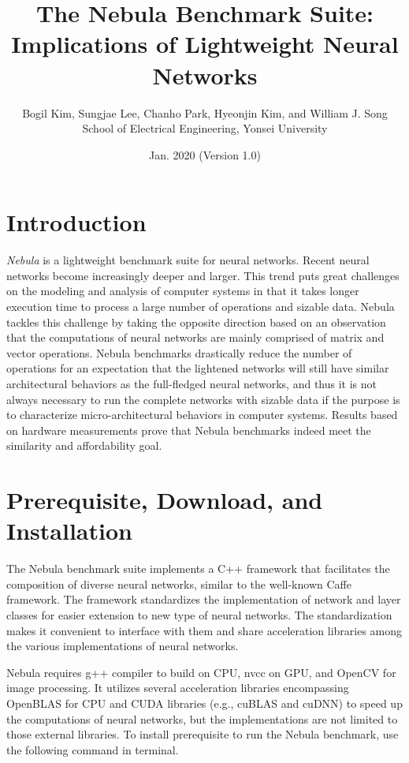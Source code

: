 \documentclass[10pt]{article}
\begin{document}
\title{The Nebula Benchmark Suite: Implications of Lightweight Neural Networks}
\author{Bogil Kim, Sungjae Lee, Chanho Park, Hyeonjin Kim, and William J. Song\\
        School of Electrical Engineering, Yonsei University\\}
\date{Jan. 2020 (Version 1.0)}
\maketitle

\section{Introduction} \label{sec:introduction}
\emph{Nebula} is a lightweight benchmark suite for neural networks. 
Recent neural networks become increasingly deeper and larger. 
This trend puts great challenges on the modeling and analysis of computer systems in that it takes longer execution time to process a large number of operations and sizable data. 
Nebula tackles this challenge by taking the opposite direction based on an observation that the computations of neural networks are mainly comprised of matrix and vector operations. 
Nebula benchmarks drastically reduce the number of operations for an expectation that the lightened networks will still have similar architectural behaviors as the full-fledged neural networks, and thus it is not always necessary to run the complete networks with sizable data if the purpose is to characterize micro-architectural behaviors in computer systems. 
Results based on hardware measurements prove that Nebula benchmarks indeed meet the similarity and affordability goal.

\section{Prerequisite, Download, and Installation} \label{sec:install}
The Nebula benchmark suite implements a C++ framework that facilitates the composition of diverse neural networks, similar to the well-known Caffe framework.
The framework standardizes the implementation of network and layer classes for easier extension to new type of neural networks.
The standardization makes it convenient to interface with them and share acceleration libraries among the various implementations of neural networks.

Nebula requires g++ compiler to build on CPU, nvcc on GPU, and OpenCV for image processing.
It utilizes several acceleration libraries encompassing OpenBLAS for CPU and CUDA libraries (e.g., cuBLAS and cuDNN) to speed up the computations of neural networks, but the implementations are not limited to those external libraries.
To install prerequisite to run the Nebula benchmark, use the following command in terminal.
\end{document}
